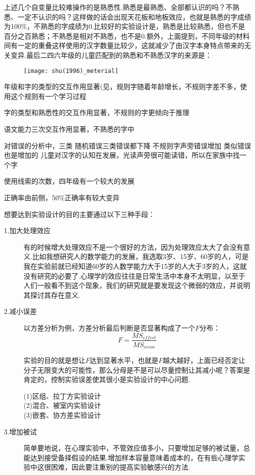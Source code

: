 上述几个自变量比较难操作的是熟悉性.熟悉是最熟悉、全部都认识的吗？不熟悉、一定不认识的吗？这样做的话会出现天花板和地板效应，也就是熟悉的字成绩为100\%，不熟悉的字成绩为0.比较好的实验设计是，熟悉是比较熟悉，但也不是百分之百熟悉；不熟悉是相对不熟悉，也不是0.额外，上面提到，不同年级的材料间有一定的重叠这样使用的汉字数量比较少，这就减少了由汉字本身特点带来的无关变异.最后二四六年级的儿童匹配到的熟悉和不熟悉汉字的来源是：

\begin{figure}[hb]
	\texttt{[image: shu(1996)\_meterial]}
\end{figure}

年级和字的类型的交互作用显著(见，规则字随着年龄增长，不规则字差不多，使用这个规则有一个学习过程

字的类型和熟悉性的交互作用显著，不规则的字更倾向于推理

语文能力三次交互作用显著，不熟悉的字中

对错误的分析中，三类
随机错误三类错误都下降
不规则字声旁错误增加
类似错误也是增加的
儿童对汉字的认知在发展，光读声旁很可能读错，所以在家族中找一个字

使用线索的次数，四年级有一个较大的发展

正确率由前侧，50\%正确率有较大变异

想要达到实验设计的目的主要通过以下三种手段：
\begin{description}
	\item[1.加大处理效应]
	有的时候增大处理效应不是一个很好的方法，因为处理效应太大了会没有意义.比如我想研究人的数学能力的发展，我选取3岁、15岁、60岁的人，可是我在实验前就已经知道60岁的人数学能力大于15岁的人大于3岁的人，这就没有研究的必要了.心理学的效应往往是日常生活中本身不太明显，以至于人们一般看不到这个现象，我们的研究就是要发现这个微弱的效应，并说明其探讨其存在意义.
	
	\item[2.减小误差]
	以方差分析为例，方差分析最后判断是否显著构成了一个$F$分布：
	$$
	F=\frac{MS_{effect}}{MS_{error}}
	$$
	
	实验的目的就是想让$F$达到显著水平，也就是$F$越大越好，上面已经否定让分子无限变大的可能性，那么分母是不是可以尽量控制让其减小呢？答案是肯定的，控制实验误差使其很小是实验设计的中心问题.
	
	\begin{kaobox}[frametitle=通过实验设计减小误差的方法]
		(1)区组、拉丁方实验设计\\
		(2)混合、被室内实验设计\\
		(3)嵌套、协方差实验设计
	\end{kaobox}
	
	\item[3.增加被试]简单要地说，在心理实验中，不管效应值多小，只要增加足够的被试量，总能达到接受备择假设的结果.增加样本容量意味着成本的，在有些心理学实验中这很困难，因此要注重别的提高实验敏感兴的方法.
\end{description}


